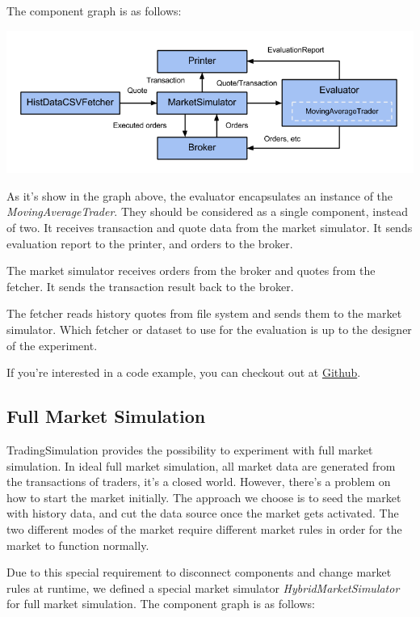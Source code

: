 The component graph is as follows:

\noindent
\includegraphics[width=\textwidth]{img/examples/evaluation}

As it's show in the graph above, the evaluator encapsulates an instance of the \emph{MovingAverageTrader}. They should be considered as a single component, instead of two. It receives transaction and quote data from the market simulator. It sends evaluation report to the printer, and orders to the broker.

The market simulator receives orders from the broker and quotes from the fetcher. It sends the transaction result back to the broker.

The fetcher reads history quotes from file system and sends them to the market simulator. Which fetcher or dataset to use for the evaluation is up to the designer of the experiment.

If you're interested in a code example, you can checkout out at \href{https://github.com/merlinND/TradingSimulation/blob/master/ts/src/main/scala/ch/epfl/ts/evaluation/EvaluationRunner.scala}{Github}.

\subsection{Full Market Simulation}

TradingSimulation provides the possibility to experiment with full market simulation. In ideal full market simulation, all market data are generated from the transactions of traders, it's a closed world. However, there's a problem on how to start the market initially. The approach we choose is to seed the market with history data, and cut the data source once the market gets activated. The two different modes of the market require different market rules in order for the market to function normally.

Due to this special requirement to disconnect components and change market rules at runtime, we defined a special market simulator \emph{HybridMarketSimulator} for full market simulation. The component graph is as follows:

